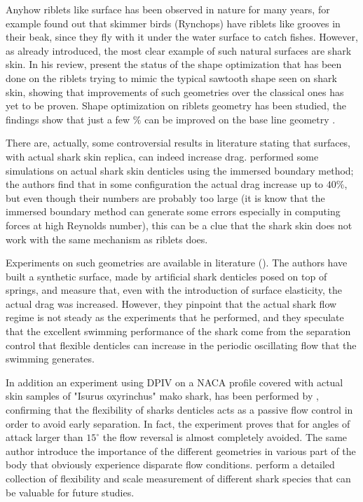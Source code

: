 Anyhow riblets like surface has been observed in nature for many years, for example \citet{Martin2016riblets} found out that skimmer birds (Rynchops) have riblets like grooves in their beak, since they fly with it under the water surface to catch fishes.
However, as already introduced, the most clear example of such natural surfaces are shark skin.
In his review, \citet{dean2010shark} present the status of the shape optimization that has been done on the riblets trying to mimic the typical sawtooth shape seen on shark skin, showing that improvements of such geometries over the classical ones has yet to be proven.
Shape optimization on riblets geometry has been studied, the findings show that just a few $\%$ can be improved on the base line geometry \citet{bechert1997experiments}.

There are, actually, some controversial results in literature stating that surfaces, with actual shark skin replica, can indeed increase drag.
\citet{boomsma2016direct} performed some simulations on actual shark skin denticles using the immersed boundary method; the authors find that in some configuration the actual drag increase up to $40\%$, but even though their numbers are probably too large (it is know that the immersed boundary method can generate some errors especially in computing forces at high Reynolds number), this can be a clue that the shark skin does not work with the same mechanism as riblets does.

Experiments on such geometries are available in literature (\citet{bechert1997natural}).
The authors have built a synthetic surface, made by artificial shark denticles posed on top of springs, and measure that, even with the introduction of surface elasticity, the actual drag was increased.
However, they pinpoint that the actual shark flow regime is not steady as the experiments that he performed, and they speculate that the excellent swimming performance of the shark come from the separation control that flexible denticles can increase in the periodic oscillating flow that the swimming generates.

In addition an experiment using DPIV on a NACA profile covered with actual skin samples of "Isurus oxyrinchus" mako shark, has been performed by \citet{lang2014SharkControl}, confirming that the flexibility of sharks denticles acts as a passive flow control in order to avoid early separation.
In fact, the experiment proves that for angles of attack larger than $15^{\circ}$ the flow reversal is almost completely avoided.
The same author introduce the importance of the different geometries in various part of the body that obviously experience disparate flow conditions.
\citet{motta2012Shark} perform a detailed collection of flexibility and scale measurement of different shark species that can be valuable for future studies.


